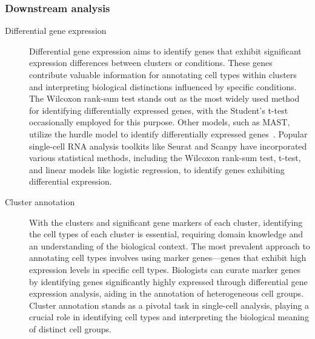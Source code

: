 
\subsubsection{Downstream analysis}
\begin{description}
	\item[Differential gene expression] 
	Differential gene expression aims to identify genes that exhibit significant expression differences between clusters or conditions. These genes contribute valuable information for annotating cell types within clusters and interpreting biological distinctions influenced by specific conditions. The Wilcoxon rank-sum test stands out as the most widely used method for identifying differentially expressed genes, with the Student's t-test occasionally employed for this purpose. Other models, such as MAST, utilize the hurdle model to identify differentially expressed genes~\citep{finak2015mast}. Popular single-cell RNA analysis toolkits like Seurat and Scanpy have incorporated various statistical methods, including the Wilcoxon rank-sum test, t-test, and linear models like logistic regression, to identify genes exhibiting differential expression.

	\item[Cluster annotation]
	With the clusters and significant gene markers of each cluster, identifying the cell types of each cluster is essential, requiring domain knowledge and an understanding of the biological context. The most prevalent approach to annotating cell types involves using marker genes—genes that exhibit high expression levels in specific cell types. Biologists can curate marker genes by identifying genes significantly highly expressed through differential gene expression analysis, aiding in the annotation of heterogeneous cell groups. Cluster annotation stands as a pivotal task in single-cell analysis, playing a crucial role in identifying cell types and interpreting the biological meaning of distinct cell groups.


\end{description}

